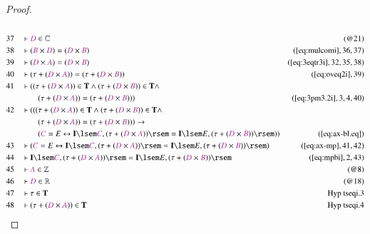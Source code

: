 \begin{proof}
\begin{align}
  \\ 37 &&  & \vdash \mc{D} \in \mathbb{C}&(@21)\notag
  \\ 38 &&  & \vdash ( \mc{B} \times \mc{D} ) = ( \mc{D} \times \mc{B}
      )&(\mbox{\ref{eq:mulcomi}},36,37)\notag
  \\ 39 &&  & \vdash ( \mc{D} \times \mc{A} ) = ( \mc{D} \times \mc{B}
      )&(\mbox{\ref{eq:3eqtr3i}},32,35,38)\notag
  \\ 40 &&  & \vdash ( \tau + ( \mc{D} \times \mc{A} ) ) = ( \tau + ( \mc{D}
      \times \mc{B} ) )&(\mbox{\ref{eq:oveq2i}},39)\notag
  \\ 41 &&  & \vdash ( ( \tau + ( \mc{D} \times \mc{A} ) ) \in \mathbf{T} \wedge
      ( \tau + ( \mc{D} \times \mc{B} ) ) \in \mathbf{T}
      \wedge  \notag \\ & & & \qquad
     ( \tau + ( \mc{D} \times \mc{A} ) ) = ( \tau +
      ( \mc{D} \times \mc{B} ) )
      )&(\mbox{\ref{eq:3pm3.2i}},3,4,40)\notag
  \\ 42 &&  & \vdash ( ( ( \tau + ( \mc{D} \times \mc{A} ) ) \in \mathbf{T}
      \wedge ( \tau + ( \mc{D} \times \mc{B} ) ) \in
      \mathbf{T} \wedge  \notag \\ & & & \qquad
     ( \tau + ( \mc{D} \times \mc{A} ) )
      = ( \tau + ( \mc{D} \times \mc{B} ) ) ) \rightarrow  \notag \\ & & & \qquad
     (
      \mc{C} = E \leftrightarrow \mathbf{I} \lsem \mc{C} ,
      ( \tau + ( \mc{D} \times \mc{A} ) ) \rsem = \mathbf{I}
      \lsem E , ( \tau + ( \mc{D} \times \mc{B} ) ) \rsem )
      )&(\mbox{\ref{eq:ax-bl.eq}})\notag
  \\ 43 &&  & \vdash ( \mc{C} = E \leftrightarrow \mathbf{I} \lsem \mc{C} , (
      \tau + ( \mc{D} \times \mc{A} ) ) \rsem = \mathbf{I}
      \lsem E , ( \tau + ( \mc{D} \times \mc{B} ) ) \rsem
      )&(\mbox{\ref{eq:ax-mp}},41,42)\notag
  \\ 44 &&  & \vdash \mathbf{I} \lsem \mc{C} , ( \tau + ( \mc{D} \times \mc{A} )
      ) \rsem = \mathbf{I} \lsem E , ( \tau + ( \mc{D}
      \times \mc{B} ) )
      \rsem&(\mbox{\ref{eq:mpbi}},2,43)\notag
  \\ 45 &&  & \vdash \mc{A} \in \mathbb{Z}&(@8)\notag
  \\ 46 &&  & \vdash \mc{D} \in \mathbb{R}&(@18)\notag
  \\ 47 &&  & \vdash \tau \in \mathbf{T}&\text{Hyp~tseqi.3}\notag%
  \\ 48 &&  & \vdash ( \tau + ( \mc{D} \times \mc{A} ) ) \in
      \mathbf{T}&\text{Hyp~tseqi.4}\notag%

\end{align}
\end{proof}
